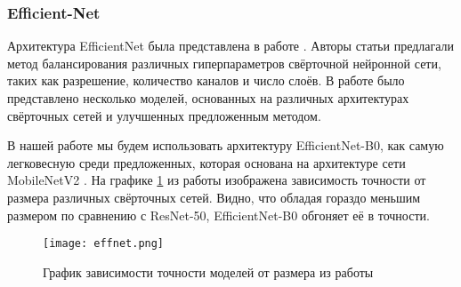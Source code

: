 \subsubsection{Efficient-Net}

Архитектура EfficientNet была представлена в работе \cite{Efficientnet}. Авторы статьи предлагали метод 
балансирования различных гиперпараметров свёрточной нейронной сети, таких как разрешение, количество каналов  и число слоёв.
В работе \cite{Efficientnet} было представлено несколько моделей, основанных на различных архитектурах свёрточных сетей
и улучшенных предложенным методом.

В нашей работе мы будем использовать архитектуру EfficientNet-B0, как самую легковесную среди предложенных,
которая основана на архитектуре сети MobileNetV2 \cite{MobileNetV2}. На графике \ref{fig:effent} из работы \cite{Efficientnet}
изображена зависимость точности от размера различных свёрточных сетей. Видно, что обладая гораздо меньшим размером 
по сравнению с ResNet-50, EfficientNet-B0 обгоняет её в точности.

 \begin{figure}[h!]
    \centering
    \texttt{[image: effnet.png]}
    \caption{График зависимости точности моделей от размера из работы \cite{Efficientnet}}
    \label{fig:effent}
\end{figure}